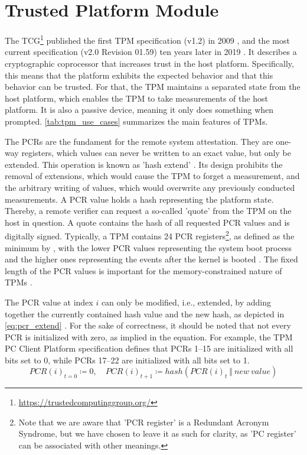 \section{Trusted Platform Module}
\label{sec:tpm}

The \ac{TCG}\footnote{\url{https://trustedcomputinggroup.org/}} published the first TPM specification (v1.2) in 2009 \cite{ISO11889}, and the most current specification (v2.0 Revision 01.59) ten years later in 2019 \cite{tpm}.
It describes a cryptographic coprocessor that increases trust in the host platform. Specifically, this means that the platform exhibits the expected behavior and that this behavior can be trusted.
For that, the TPM maintains a separated state from the host platform, which enables the TPM to take measurements of the host platform.
It is also a passive device, meaning it only does something when prompted.
\autoref{tab:tpm_use_cases} summarizes the main features of TPMs.



The \acp{PCR} are the fundament for the remote system attestation. They are one-way registers, which values can never be written to an exact value, but only be extended.
This operation is known as 'hash extend' \cite{Arthur2015}.
Its design prohibits the removal of extensions, which would cause the TPM to forget a measurement, and the arbitrary writing of values, which would overwrite any previously conducted measurements.
A PCR value holds a hash representing the platform state.
Thereby, a remote verifier can request a so-called 'quote' from the TPM on the host in question.
A quote contains the hash of all requested PCR values and is digitally signed.
Typically, a TPM contains 24 PCR registers\footnote{Note that we are aware that 'PCR register' is a Redundant Acronym Syndrome, but we have chosen to leave it as such for clarity, as 'PC register' can be associated with other meanings.}, as defined as the minimum by \cite{tcgPcClient}, with the lower PCR values representing the system boot process and the higher ones representing the events after the kernel is booted \cite{Arthur2015}.
The fixed length of the \ac{PCR} values is important for the memory-constrained nature of TPMs \cite{Arthur2015}.

The PCR value at index $i$ can only be modified, i.e., extended, by adding together the currently contained hash value and the new hash, as depicted in \autoref{eq:pcr_extend} \cite{tpm}. For the sake of correctness, it should be noted that not every PCR is initialized with zero, as implied in the equation. For example, the TPM PC Client Platform specification \cite{tcgPcClient} defines that PCRs 1--15 are initialized with all bits set to 0, while PCRs 17--22 are initialized with all bits set to 1.
\begin{equation}
  \label{eq:pcr_extend}
PCR(i)_{t=0} \coloneqq 0,\quad PCR(i)_{t+1} \coloneqq hash(PCR(i)_t\ \Vert\ new\ value)
\end{equation}

